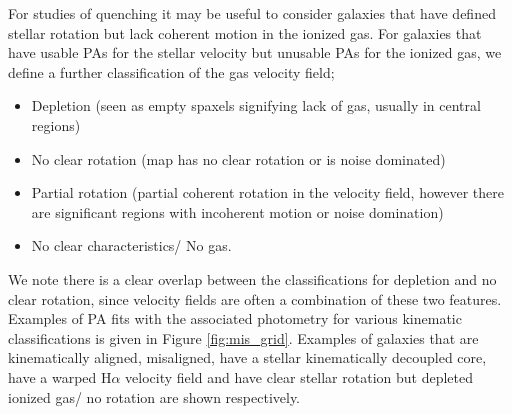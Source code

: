 For studies of quenching it may be useful to consider galaxies that have defined stellar rotation but lack coherent motion in the ionized gas. For galaxies that have usable PAs for the stellar velocity but unusable PAs for the ionized gas, we define a further classification of the gas velocity field;
\begin{itemize}
    \item Depletion (seen as empty spaxels signifying lack of gas, usually in central regions)
    \item No clear rotation (map has no clear rotation or is noise dominated)
    \item Partial rotation (partial coherent rotation in the velocity field, however there are significant regions with incoherent motion or noise domination)
    \item No clear characteristics/ No gas.
\end{itemize}
We note there is a clear overlap between the classifications for depletion and no clear rotation, since velocity fields are often a combination of these two features. 
Examples of PA fits with the associated photometry for various kinematic classifications is given in Figure \ref{fig:mis_grid}. Examples of galaxies that are kinematically aligned, misaligned, have a stellar kinematically decoupled core, have a warped H$\alpha$ velocity field and have clear stellar rotation but depleted ionized gas/ no rotation are shown respectively.

